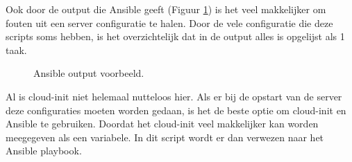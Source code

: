 Ook door de output die Ansible geeft (Figuur \ref{fig:Ansibleoutput}) is het veel makkelijker om fouten uit een server configuratie te halen. Door de vele configuratie die deze scripts soms hebben, is het overzichtelijk dat in de output alles is opgelijst als 1 taak.
\begin{figure}[!htb]
    \caption{Ansible output voorbeeld.}
    \label{fig:Ansibleoutput}
\end{figure}

Al is cloud-init niet helemaal nutteloos hier. Als er bij de opstart van de server deze configuraties moeten worden gedaan, is het de beste optie om cloud-init en Ansible te gebruiken. Doordat het cloud-init veel makkelijker kan worden meegegeven als een variabele. In dit script wordt er dan verwezen naar het Ansible playbook.

